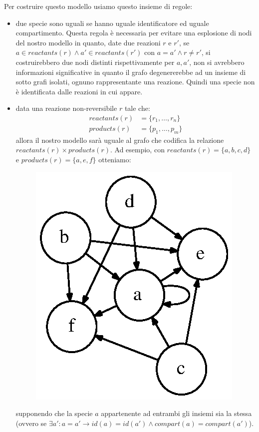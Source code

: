 Per costruire questo modello usiamo questo insieme di regole:
\begin{itemize}
\item due specie sono uguali se hanno uguale identificatore ed uguale
  compartimento. Questa regola \`e necessaria per evitare una
  esplosione di nodi del nostro modello in quanto, date due reazioni
  $r$ e $r'$, se $a \in reactants(r) \wedge a' \in reactants(r')$ con
  $a = a' \wedge r \not = r'$, si costruirebbero due nodi distinti
  rispettivamente per $a, a'$, non si avrebbero informazioni
  significative in quanto il grafo degenererebbe ad un insieme di
  sotto grafi isolati, ognuno rappresentante una reazione. Quindi una
  specie non \`e identificata dalle reazioni in cui appare.
\item data una reazione non-reversibile $r$ tale che:
  \begin{displaymath}
    \begin{split} 
      reactants(r) &= \{ r_{1}, \ldots, r_{n} \} \\
      products(r) &= \{ p_{1}, \ldots, p_{m} \}
    \end{split}
  \end{displaymath}
  allora il nostro modello sar\`a uguale al grafo che codifica la
  relazione $reactants(r) \times products(r)$. Ad esempio, con
  $reactants(r) = \{ a, b, c, d \}$ e $products(r) = \{a, e, f\}$
  otteniamo:

\begin{figure}[!htb]
\centering
\includegraphics{images/non-reversible-reaction-example.dot.eps}
\end{figure}
supponendo che la specie $a$ appartenente ad entrambi gli
insiemi sia la stessa (ovvero se $\exists a': a = a' \rightarrow id(a) =
id(a') \wedge compart(a) = compart(a')$).


\end{itemize}
